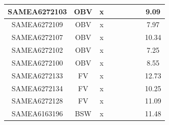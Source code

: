 \documentclass[../main.tex]{subfiles}
\begin{document}
\begin{flushleft}
\begin{footnotesize}
\begin{longtable}{|c|c|c|c|c|c|c|}
    \hline
    SAMEA6272103  & OBV   & x                                                            & ~          & ~                                                                           & ~                                                                 & 9.09      \\ 
    \hline
    SAMEA6272109  & OBV   & x                                                            & ~          & ~                                                                           & ~                                                                 & 7.97      \\ 
    \hline
    SAMEA6272107  & OBV   & x                                                            & ~          & ~                                                                           & ~                                                                 & 10.34     \\ 
    \hline
    SAMEA6272102  & OBV   & x                                                            & ~          & ~                                                                           & ~                                                                 & 7.25      \\ 
    \hline
    SAMEA6272100  & OBV   & x                                                            & ~          & ~                                                                           & ~                                                                 & 8.55      \\ 
    \hline
    SAMEA6272133  & FV    & x                                                            & ~          & ~                                                                           & ~                                                                 & 12.73     \\ 
    \hline
    SAMEA6272134  & FV    & x                                                            & ~          & ~                                                                           & ~                                                                 & 10.25     \\ 
    \hline
    SAMEA6272128  & FV    & x                                                            & ~          & ~                                                                           & ~                                                                 & 11.09     \\ 
    \hline
    SAMEA6163196  & BSW   & x                                                            & ~          & ~                                                                           & ~                                                                 & 11.48     \\ 

\end{longtable}
\end{footnotesize}
\end{flushleft}
\end{document}
